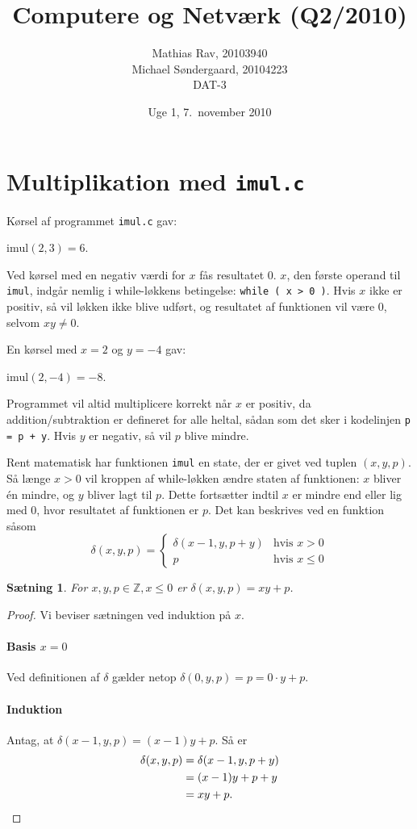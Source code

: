 \documentclass[12pt,a4paper]{article}
\title{Computere og Netværk (Q2/2010)}
\author{Mathias Rav, 20103940 \\
		Michael Søndergaard, 20104223 \\
		DAT-3}
\date{Uge 1, 7.\ november 2010}
\newcommand{\imul}{\texttt{imul}}
\newtheorem{theorem}{Sætning}
\begin{document}
\maketitle

\section{Multiplikation med \texttt{imul.c}}
Kørsel af programmet \texttt{imul.c} gav:

$\text{imul}(2,3) = 6$.

Ved kørsel med en negativ værdi for $x$ fås resultatet $0$.  $x$, den første
operand til \imul, indgår nemlig i while-løkkens betingelse: \texttt{while ( x
> 0 )}. Hvis $x$ ikke er positiv, så vil løkken ikke blive udført, og
resultatet af funktionen vil være $0$, selvom $xy\ne0$.

En kørsel med $x=2$ og $y=-4$ gav:

$\text{imul}(2,-4) = -8$.

Programmet vil altid multiplicere korrekt når $x$ er positiv, da
addition/subtraktion er defineret for alle heltal, sådan som det sker i
kodelinjen \texttt{p = p + y}.  Hvis $y$ er negativ, så vil $p$ blive mindre.

Rent matematisk har funktionen \imul{} en state, der er givet ved tuplen
$(x,y,p)$. Så længe $x>0$ vil kroppen af while-løkken ændre staten af
funktionen: $x$ bliver \'en mindre, og $y$ bliver lagt til $p$. Dette
fortsætter indtil $x$ er mindre end eller lig med $0$, hvor resultatet af
funktionen er $p$. Det kan beskrives ved en funktion såsom
\[\delta(x,y,p)=\left\{\begin{array}{cc}
	\delta(x-1,y,p+y) & \text{hvis }x>0 \\
	p & \text{hvis }x\leq 0
\end{array}\right.\]

\begin{theorem}
	For $x,y,p\in\mathbb{Z},x\leq0$ er $\delta(x,y,p)=xy+p$.
\end{theorem}

\begin{proof}
	Vi beviser sætningen ved induktion på $x$.
	\paragraph{Basis $x=0$} Ved definitionen af $\delta$ gælder netop $\delta(0,y,p)=p=0\cdot y+p$.
	\paragraph{Induktion} Antag, at $\delta(x-1,y,p)=(x-1)y+p$. Så er
	\begin{align*}
		\delta(x,y,p)&=\delta(x-1,y,p+y) \\
		&=(x-1)y+p+y \\
		&=xy+p. \qedhere{}
	\end{align*}
\end{proof}
\end{document}
